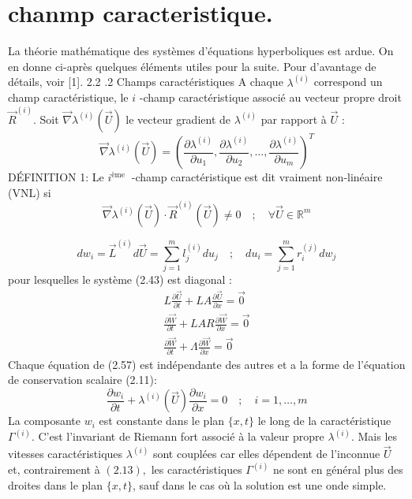 
\section{chanmp caracteristique.}
La théorie mathématique des systèmes d'équations hyperboliques est ardue. On en donne ci-après quelques éléments utiles pour la suite. Pour d'avantage de détails, voir [1].
2.2 .2 Champs caractéristiques
A chaque $\lambda^{(i)}$ correspond un champ caractéristique, le $i$ -champ caractéristique associé au vecteur propre droit $\vec{R}^{(i)}$. Soit $\vec{\nabla} \lambda^{(i)}(\vec{U})$ le vecteur gradient de $\lambda^{(i)}$ par rapport à $\vec{U}$ :
$$
\vec{\nabla} \lambda^{(i)}(\vec{U})=\left(\frac{\partial \lambda^{(i)}}{\partial u_{1}}, \frac{\partial \lambda^{(i)}}{\partial u_{2}}, \ldots, \frac{\partial \lambda^{(i)}}{\partial u_{m}}\right)^{T}
$$
DÉFINITION 1: Le $i^{\text {ème }}$ -champ caractéristique est dit vraiment non-linéaire (VNL) si
$$
\vec{\nabla} \lambda^{(i)}(\vec{U}) \cdot \vec{R}^{(i)}(\vec{U}) \neq 0 \quad ; \quad \forall \vec{U} \in \mathbb{R}^{m}
$$

$$
d w_{i}=\vec{L}^{(i)} d \vec{U}=\sum_{j=1}^{m} l_{j}^{(i)} d u_{j} \quad ; \quad d u_{i}=\sum_{j=1}^{m} r_{i}^{(j)} d w_{j}
$$
pour lesquelles le système (2.43) est diagonal :
$$
\begin{array}{l}
L \frac{\partial \vec{U}}{\partial t}+L A \frac{\partial \vec{U}}{\partial x}=\overrightarrow{0} \\
\frac{\partial \vec{W}}{\partial t}+L A R \frac{\partial \vec{W}}{\partial x}=\overrightarrow{0} \\
\frac{\partial \vec{W}}{\partial t}+\Lambda \frac{\partial \vec{W}}{\partial x}=\overrightarrow{0}
\end{array}
$$
Chaque équation de (2.57) est indépendante des autres et a la forme de l'équation de conservation scalaire (2.11):
$$
\frac{\partial w_{i}}{\partial t}+\lambda^{(i)}(\vec{U}) \frac{\partial w_{i}}{\partial x}=0 \quad ; \quad i=1, \ldots, m
$$
La composante $w_{i}$ est constante dans le plan $\{x, t\}$ le long de la caractéristique $\Gamma^{(i)} .$ C'est l'invariant de Riemann fort associé à la valeur propre $\lambda^{(i)} .$ Mais les vitesses caractéristiques $\lambda^{(i)}$ sont couplées car elles dépendent de l'inconnue $\vec{U}$ et, contrairement à $(2.13),$ les caractéristiques $\Gamma^{(i)}$ ne sont en général plus des droites dans le plan $\{x, t\}$, sauf dans le cas où la solution est une onde simple.

